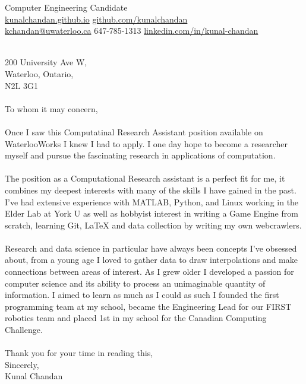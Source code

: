 \documentclass[]{chandan-cv}
\begin{document}
%
%

%
%
{ 
Computer Engineering Candidate \\
\href{http://kunalchandan.github.io}{kunalchandan.github.io}
\hfill
\href{http://github.com/kunalchandan}{github.com/kunalchandan}\\
\href{mailto:kchandan@uwaterloo.ca}{kchandan@uwaterloo.ca}
\hfill
647-785-1313
\hfill 
\href{https://www.linkedin.com/in/kunal-chandan/}{linkedin.com/in/kunal-chandan}
}
\begin{minipage}[t]{0.2\textwidth}
\end{minipage}
\begin{minipage}[t]{0.8\textwidth}
\\
\vspace{50}
\large
200 University Ave W,\\
Waterloo, Ontario,\\
N2L 3G1\\
\\
To whom it may concern,\\
\\
Once I saw this Computatinal Research Assistant position available on WaterlooWorks I knew I had to apply. I one day hope to become a researcher myself and pursue the fascinating research in applications of computation.\\
\\
The position as a Computational Research assistant is a perfect fit for me, it combines my deepest interests with many of the skills I have gained in the past. I've had extensive experience with MATLAB, Python, and Linux working in the Elder Lab at York U as well as hobbyist interest in writing a Game Engine from scratch, learning Git, LaTeX and data collection by writing my own webcrawlers.\\
\\
Research and data science in particular have always been concepts I’ve obsessed about, from a young age I loved to gather data to draw interpolations and make connections between areas of interest. As I grew older I developed a passion for computer science and its ability to process an unimaginable quantity of information. I aimed to learn as much as I could as such I founded the first programming team at my school, became the Engineering Lead for our FIRST robotics team and placed 1st in my school for the Canadian Computing Challenge.\\
\\
Thank you for your time in reading this,\\
Sincerely,\\
Kunal Chandan\\
\\
\end{minipage}
\end{document}
